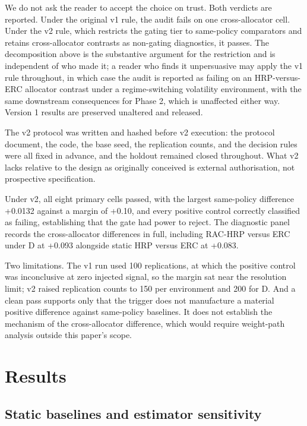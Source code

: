 \documentclass[12pt,letterpaper]{article}
\begin{document}
We do not ask the reader to accept the choice on trust. Both verdicts are reported. Under
the original v1 rule, the audit fails on one cross-allocator cell. Under the v2 rule,
which restricts the gating tier to same-policy comparators and retains cross-allocator
contrasts as non-gating diagnostics, it passes. The decomposition above is the
substantive argument for the restriction and is independent of who made it; a reader who
finds it unpersuasive may apply the v1 rule throughout, in which case the audit is
reported as failing on an HRP-versus-ERC allocator contrast under a regime-switching
volatility environment, with the same downstream consequences for Phase 2, which is
unaffected either way. Version 1 results are preserved unaltered and released.

The v2 protocol was written and hashed before v2 execution: the protocol document, the
code, the base seed, the replication counts, and the decision rules were all fixed in
advance, and the holdout remained closed throughout. What v2 lacks relative to the design
as originally conceived is external authorisation, not prospective specification.

Under v2, all eight primary cells passed, with the largest same-policy difference +0.0132
against a margin of +0.10, and every positive control correctly classified as failing,
establishing that the gate had power to reject. The diagnostic panel records the
cross-allocator differences in full, including RAC-HRP versus ERC under D at +0.093
alongside static HRP versus ERC at +0.083.

Two limitations. The v1 run used 100 replications, at which the positive control was
inconclusive at zero injected signal, so the margin sat near the resolution limit; v2
raised replication counts to 150 per environment and 200 for D. And a clean pass supports
only that the trigger does not manufacture a material positive difference against
same-policy baselines. It does not establish the mechanism of the cross-allocator
difference, which would require weight-path analysis outside this paper's scope.

\section{Results}

\subsection{Static baselines and estimator sensitivity}
\end{document}
